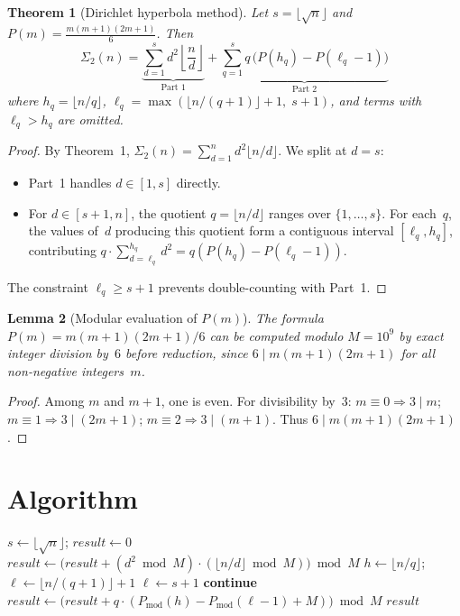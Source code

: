 \documentclass[11pt]{article}
\newtheorem{theorem}{Theorem}
\newtheorem{lemma}[theorem]{Lemma}
\begin{document}
\begin{theorem}[Dirichlet hyperbola method]
\label{thm:hyperbola}
Let $s = \lfloor\sqrt{n}\rfloor$ and $P(m) = \frac{m(m+1)(2m+1)}{6}$.  Then
\[
  \Sigma_2(n) = \underbrace{\sum_{d=1}^{s} d^2 \left\lfloor\frac{n}{d}\right\rfloor}_{\text{Part 1}}
              + \underbrace{\sum_{q=1}^{s} q\,\bigl(P(h_q) - P(\ell_q - 1)\bigr)}_{\text{Part 2}}
\]
where $h_q = \lfloor n/q\rfloor$, $\ell_q = \max(\lfloor n/(q{+}1)\rfloor + 1,\; s{+}1)$, and terms with $\ell_q > h_q$ are omitted.
\end{theorem}

\begin{proof}
By Theorem~1, $\Sigma_2(n) = \sum_{d=1}^{n} d^2 \lfloor n/d\rfloor$.  We split at $d = s$:
\begin{itemize}
  \item Part~1 handles $d \in [1,s]$ directly.
  \item For $d \in [s{+}1, n]$, the quotient $q = \lfloor n/d\rfloor$ ranges over $\{1,\ldots,s\}$.  For each~$q$, the values of~$d$ producing this quotient form a contiguous interval $[\ell_q, h_q]$, contributing $q \cdot \sum_{d=\ell_q}^{h_q} d^2 = q(P(h_q) - P(\ell_q - 1))$.
\end{itemize}
The constraint $\ell_q \ge s{+}1$ prevents double-counting with Part~1.
\end{proof}

\begin{lemma}[Modular evaluation of $P(m)$]
The formula $P(m) = m(m{+}1)(2m{+}1)/6$ can be computed modulo $M = 10^9$ by exact integer division by~$6$ before reduction, since $6 \mid m(m{+}1)(2m{+}1)$ for all non-negative integers~$m$.
\end{lemma}

\begin{proof}
Among $m$ and $m{+}1$, one is even.  For divisibility by~$3$: $m \equiv 0 \Rightarrow 3 \mid m$; $m \equiv 1 \Rightarrow 3 \mid (2m{+}1)$; $m \equiv 2 \Rightarrow 3 \mid (m{+}1)$.  Thus $6 \mid m(m{+}1)(2m{+}1)$.
\end{proof}

\section{Algorithm}

\begin{algorithmic}[1]
  \State $s \gets \lfloor\sqrt{n}\rfloor$; \; $\mathit{result} \gets 0$
   
    \State $\mathit{result} \gets \bigl(\mathit{result} + (d^2 \bmod M)\cdot(\lfloor n/d\rfloor \bmod M)\bigr) \bmod M$
  \EndFor
   
    \State $h \gets \lfloor n/q\rfloor$; \; $\ell \gets \lfloor n/(q{+}1)\rfloor + 1$
     $\ell \gets s + 1$ \EndIf
     \textbf{continue} \EndIf
    \State $\mathit{result} \gets \bigl(\mathit{result} + q \cdot (P_{\mathrm{mod}}(h) - P_{\mathrm{mod}}(\ell{-}1) + M)\bigr) \bmod M$
  \EndFor
  \State \Return $\mathit{result}$
\EndFunction
\end{algorithmic}
\end{document}
